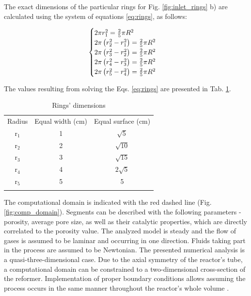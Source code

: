 \documentclass[preprint,12pt]{elsarticle}
\begin{document}
The exact dimensions of the particular rings for Fig. \ref{fig:inlet_rings} b) are calculated using the system of equations \eqref{eq:rings}, as follows:

\begin{equation}
\centering
\label{eq:rings}
\begin{cases}
	2\pi r_1^2 = \frac{2}{5}\pi R^2 \\
	2\pi \left(r_2^2 - r_1^2 \right) = \frac{2}{5}\pi R^2 \\
	2\pi \left(r_3^2 - r_2^2 \right) = \frac{2}{5}\pi R^2 \\
	2\pi \left(r_4^2 - r_3^2 \right) = \frac{2}{5}\pi R^2 \\
	2\pi \left(r_5^2 - r_4^2 \right) = \frac{2}{5}\pi R^2	
\end{cases}
\end{equation}

\vspace{3mm}

The values resulting from solving the Eqs. \eqref{eq:rings} are presented in Tab. \ref{tab:rings_radius}.  


\begin{table}[h]
\centering
\caption{Rings' dimensions}
\label{tab:rings_radius}
\begin{tabular}{c||c|c}
\hline\noalign{\smallskip}
Radius & Equal width (cm) & Equal surface (cm) \\
\noalign{\smallskip}\hline\noalign{\smallskip}
r$_1$ & 1 & $\sqrt{5}$ \\
\noalign{\smallskip}\hline\noalign{\smallskip}
r$_2$ & 2 & $\sqrt{10}$  \\
\noalign{\smallskip}\hline\noalign{\smallskip}
r$_3$ & 3 & $\sqrt{15}$  \\
\noalign{\smallskip}\hline\noalign{\smallskip}
r$_4$ & 4 & $2\sqrt{5}$ \\
\noalign{\smallskip}\hline\noalign{\smallskip}
r$_5$ & 5 & 5 \\
\noalign{\smallskip}\hline
\end{tabular}

\end{table}

The computational domain is indicated with the red dashed line (Fig. \ref{fig:comp_domain}). Segments can be described with the following parameters - porosity, average pore size, as well as their catalytic properties, which are directly correlated to the porosity value. The analyzed model is steady and the flow of gases is assumed to be laminar and occurring in one direction. Fluids taking part in the process are assumed to be Newtonian. The presented numerical analysis is a quasi-three-dimensional case. Due to the axial symmetry of the reactor's tube, a computational domain can be constrained to a two-dimensional cross-section of the reformer. Implementation of proper boundary conditions allows assuming the process occurs in the same manner throughout the reactor's whole volume \cite{Patankar1980}. 
\end{document}
